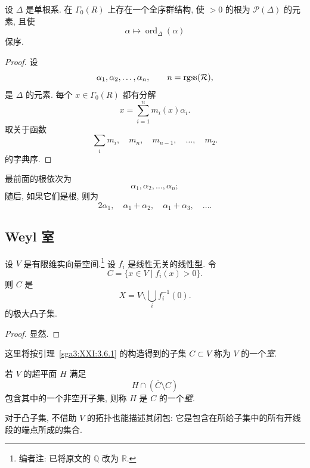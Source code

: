\begin{proposition}\label{sga3:XXI:3.5.6}
设 \(\Delta\) 是单根系. 在 \(\Gamma_0(R)\) 上存在一个全序群结构, 使 \(>0\) 的根为 \(\mathscr{P}(\Delta)\) 的元素, 且使
\[
 \alpha\longmapsto\operatorname{ord}_\Delta(\alpha)
\]
保序.
\end{proposition}
\begin{proof}
设
\[
 \alpha_1,\alpha_2,\ldots,\alpha_n,
 \qquad n=\operatorname{rgss}(\mathcal{R}),
\]
是 \(\Delta\) 的元素. 每个 \(x\in\Gamma_0(R)\) 都有分解
\[
 x=\sum_{i=1}^{n}m_i(x)\alpha_i.
\]
取关于函数
\[
 \sum_i m_i,\quad m_n,\quad m_{n-1},\quad\ldots,\quad m_2.
\]
的字典序.
\end{proof}

\begin{remark}\label{sga3:XXI:3.5.7}
最前面的根依次为
\[
 \alpha_1,\alpha_2,\ldots,\alpha_n;
\]
随后, 如果它们是根, 则为
\[
 2\alpha_1,\quad
 \alpha_1+\alpha_2,\quad
 \alpha_1+\alpha_3,\quad\ldots.
\]
\end{remark}

\subsection{Weyl 室}
\label{sga3:XXI:3.6}
\begin{lemma}\label{sga3:XXI:3.6.1}
设 \(V\) 是有限维实向量空间.\footnote{编者注: 已将原文的 \(\mathbb{Q}\) 改为 \(\mathbb{R}\).} 设 \(f_i\) 是线性无关的线性型. 令
\[
 C=\{x\in V\mid f_i(x)>0\}.
\]
则 \(C\) 是
\[
 X=V\setminus\bigcup_i f_i^{-1}(0).
\]
的极大凸子集.
\end{lemma}
\begin{proof}
显然.
\end{proof}

\begin{definition}\label{sga3:XXI:3.6.2}
这里将按引理~\ref{sga3:XXI:3.6.1} 的构造得到的子集 \(C\subset V\) 称为 \(V\) 的一个\emph{室}.
\end{definition}

\begin{definition}\label{sga3:XXI:3.6.3}
若 \(V\) 的超平面 \(H\) 满足
\[
 H\cap(\overline C\setminus C)
\]
包含其中的一个非空开子集, 则称 \(H\) 是 \(C\) 的一个\emph{壁}.
\end{definition}

\begin{remark}\label{sga3:XXI:3.6.4}
对于凸子集, 不借助 \(V\) 的拓扑也能描述其闭包: 它是包含在所给子集中的所有开线段的端点所成的集合.
\end{remark}

